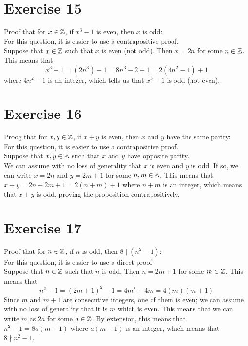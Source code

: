 \documentclass[12pt]{article}
\begin{document}
    \section*{Exercise 15}
    Proof that for $x \in \mathbb{Z}$,
    if $x^3 - 1$ is even, 
    then $x$ is odd: \\
    For this question, it is easier to use a contrapositive proof. \\
    Suppose that $x \in \mathbb{Z}$
    such that $x$ is even (not odd).
    Then $x = 2n$ for some $n \in \mathbb{Z}$.
    This means that
    \[ x^3 - 1 = (2n^3) - 1 = 8n^3 - 2 + 1 = 2(4n^2 - 1) + 1 \]
    where $4n^2 - 1$ is an integer,
    which tells us that $x^3 - 1$ is odd (not even). \\

    \section*{Exercise 16}
    Proog that for $x, y \in \mathbb{Z}$,
    if $x + y$ is even,
    then $x$ and $y$ have the same parity: \\
    For this question, it is easier to use a contrapositive proof. \\
    Suppose that $x, y \in \mathbb{Z}$
    such that $x$ and $y$ have opposite parity. \\
    We can assume with no loss of generality
    that $x$ is even and $y$ is odd. 
    If so, we can write $x = 2n$ and $y = 2m + 1$
    for some $n, m \in \mathbb{Z}$.
    This means that $x + y = 2n + 2m + 1 = 2(n+m) + 1$
    where $n + m$ is an integer,
    which means that $x + y$ is odd,
    proving the proposition contrapositively. \\

    \section*{Exercise 17}
    Proof that for $n \in \mathbb{Z}$,
    if $n$ is odd,
    then $8 \mid (n^2 - 1)$: \\
    For this question, it is easier to use a direct proof. \\
    Suppose that $n \in \mathbb{Z}$
    such that $n$ is odd.
    Then $n = 2m+1$ for some $m \in \mathbb{Z}$.
    This means that
    \[ n^2 - 1 = (2m+1)^2 - 1 = 4m^2 + 4m = 4(m)(m+1) \]
    Since $m$ and $m+1$ are consecutive integers,
    one of them is even;
    we can assume with no loss of generality that it is $m$
    which is even.
    This means that we can write $m$ as $2a$ for some $a \in \mathbb{Z}$.
    By extension, this means that $n^2 - 1 = 8a(m+1)$
    where $a(m+1)$ is an integer,
    which means that $8 \nmid n^2 - 1$. \\
\end{document}
